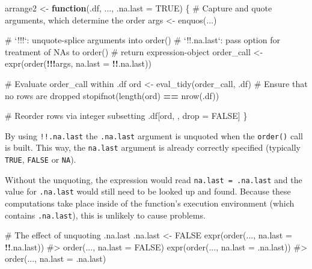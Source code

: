 \documentclass[
]{krantz}
\makeatletter
\newenvironment{Shaded}{\begin{snugshade}}{\end{snugshade}}
\newcommand{\CommentTok}[1]{\textcolor[rgb]{0.56,0.35,0.01}{\textit{#1}}}
\newcommand{\ControlFlowTok}[1]{\textcolor[rgb]{0.13,0.29,0.53}{\textbf{#1}}}
\newcommand{\DataTypeTok}[1]{\textcolor[rgb]{0.13,0.29,0.53}{#1}}
\newcommand{\KeywordTok}[1]{\textcolor[rgb]{0.13,0.29,0.53}{\textbf{#1}}}
\newcommand{\NormalTok}[1]{#1}
\newcommand{\OperatorTok}[1]{\textcolor[rgb]{0.81,0.36,0.00}{\textbf{#1}}}
\newcommand{\OtherTok}[1]{\textcolor[rgb]{0.56,0.35,0.01}{#1}}
\newcommand{\StringTok}[1]{\textcolor[rgb]{0.31,0.60,0.02}{#1}}
\newenvironment{kframe}{%
\medskip{}
\setlength{\fboxsep}{.8em}
 \def\at@end@of@kframe{}%
 \ifinner\ifhmode%
  \def\at@end@of@kframe{\end{minipage}}%
  \begin{minipage}{\columnwidth}%
 \fi\fi%
 \def\FrameCommand##1{\hskip\@totalleftmargin \hskip-\fboxsep
 \colorbox{shadecolor}{##1}\hskip-\fboxsep
     \hskip-\linewidth \hskip-\@totalleftmargin \hskip\columnwidth}%
 \MakeFramed {\advance\hsize-\width
   \@totalleftmargin\z@ \linewidth\hsize
   \@setminipage}}%
 {\par\unskip\endMakeFramed%
 \at@end@of@kframe}
\renewenvironment{Shaded}{\begin{kframe}}{\end{kframe}}
\renewcommand{\KeywordTok} [1]{\textcolor[rgb]{0.00,0.44,0.13}{{#1}}}
\renewcommand{\DataTypeTok}[1]{\textcolor[rgb]{0.56,0.13,0.00}{{#1}}}
\renewcommand{\StringTok}  [1]{\textcolor[rgb]{0.25,0.44,0.63}{{#1}}}
\renewcommand{\CommentTok} [1]{\textcolor[rgb]{0.38,0.63,0.69}{{#1}}}
\renewcommand{\OtherTok}   [1]{\textcolor[rgb]{0.00,0.44,0.13}{{#1}}}
\renewcommand{\NormalTok}  [1]{{#1}}
\makeatother
\begin{document}
\begin{Shaded}
\begin{Highlighting}[]
\NormalTok{arrange2 <-}\StringTok{ }\ControlFlowTok{function}\NormalTok{(.df, ..., }\DataTypeTok{.na.last =} \OtherTok{TRUE}\NormalTok{) \{}
  \CommentTok{# Capture and quote arguments, which determine the order}
\NormalTok{  args <-}\StringTok{ }\KeywordTok{enquos}\NormalTok{(...)  }
  
  \CommentTok{# `!!!`: unquote-splice arguments into order()}
  \CommentTok{# `!!.na.last`: pass option for treatment of NAs to order()}
  \CommentTok{# return expression-object}
\NormalTok{  order_call <-}\StringTok{ }\KeywordTok{expr}\NormalTok{(}\KeywordTok{order}\NormalTok{(}\OperatorTok{!!!}\NormalTok{args, }\DataTypeTok{na.last =} \OperatorTok{!!}\NormalTok{.na.last))}
  
  \CommentTok{# Evaluate order_call within .df}
\NormalTok{  ord <-}\StringTok{ }\KeywordTok{eval_tidy}\NormalTok{(order_call, .df)    }
  \CommentTok{# Ensure that no rows are dropped}
  \KeywordTok{stopifnot}\NormalTok{(}\KeywordTok{length}\NormalTok{(ord) }\OperatorTok{==}\StringTok{ }\KeywordTok{nrow}\NormalTok{(.df))  }
  
  \CommentTok{# Reorder rows via integer subsetting}
\NormalTok{  .df[ord, , drop =}\StringTok{ }\OtherTok{FALSE}\NormalTok{]  }
\NormalTok{\}}
\end{Highlighting}
\end{Shaded}

By using \texttt{!!.na.last} the \texttt{.na.last} argument is unquoted when the \texttt{order()} call is built. This way, the \texttt{na.last} argument is already correctly specified (typically \texttt{TRUE}, \texttt{FALSE} or \texttt{NA}).

Without the unquoting, the expression would read \texttt{na.last\ =\ .na.last} and the value for \texttt{.na.last} would still need to be looked up and found. Because these computations take place inside of the function's execution environment (which contains \texttt{.na.last}), this is unlikely to cause problems.

\begin{Shaded}
\begin{Highlighting}[]
\CommentTok{# The effect of unquoting .na.last}
\NormalTok{.na.last <-}\StringTok{ }\OtherTok{FALSE}
\KeywordTok{expr}\NormalTok{(}\KeywordTok{order}\NormalTok{(..., }\DataTypeTok{na.last =} \OperatorTok{!!}\NormalTok{.na.last))}
\CommentTok{#> order(..., na.last = FALSE)}
\KeywordTok{expr}\NormalTok{(}\KeywordTok{order}\NormalTok{(..., }\DataTypeTok{na.last =}\NormalTok{ .na.last))}
\CommentTok{#> order(..., na.last = .na.last)}
\end{Highlighting}
\end{Shaded}
\end{document}

